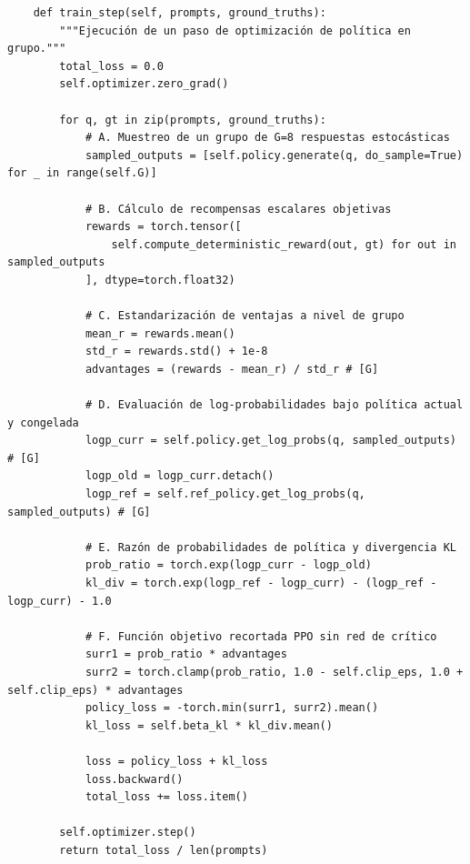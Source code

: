 \begin{tcolorbox}[colback=bg_marfil, colframe=unmsm_gold, arc=3pt, boxrule=0.6pt, top=0.2cm, bottom=0.2cm, left=0.4cm, right=0.4cm]
\scriptsize\ttfamily
\begin{verbatim}
    def train_step(self, prompts, ground_truths):
        """Ejecución de un paso de optimización de política en grupo."""
        total_loss = 0.0
        self.optimizer.zero_grad()
        
        for q, gt in zip(prompts, ground_truths):
            # A. Muestreo de un grupo de G=8 respuestas estocásticas
            sampled_outputs = [self.policy.generate(q, do_sample=True) for _ in range(self.G)]
            
            # B. Cálculo de recompensas escalares objetivas
            rewards = torch.tensor([
                self.compute_deterministic_reward(out, gt) for out in sampled_outputs
            ], dtype=torch.float32)
            
            # C. Estandarización de ventajas a nivel de grupo
            mean_r = rewards.mean()
            std_r = rewards.std() + 1e-8
            advantages = (rewards - mean_r) / std_r # [G]
            
            # D. Evaluación de log-probabilidades bajo política actual y congelada
            logp_curr = self.policy.get_log_probs(q, sampled_outputs) # [G]
            logp_old = logp_curr.detach()
            logp_ref = self.ref_policy.get_log_probs(q, sampled_outputs) # [G]
            
            # E. Razón de probabilidades de política y divergencia KL
            prob_ratio = torch.exp(logp_curr - logp_old)
            kl_div = torch.exp(logp_ref - logp_curr) - (logp_ref - logp_curr) - 1.0
            
            # F. Función objetivo recortada PPO sin red de crítico
            surr1 = prob_ratio * advantages
            surr2 = torch.clamp(prob_ratio, 1.0 - self.clip_eps, 1.0 + self.clip_eps) * advantages
            policy_loss = -torch.min(surr1, surr2).mean()
            kl_loss = self.beta_kl * kl_div.mean()
            
            loss = policy_loss + kl_loss
            loss.backward()
            total_loss += loss.item()
            
        self.optimizer.step()
        return total_loss / len(prompts)
\end{verbatim}
\end{tcolorbox}

